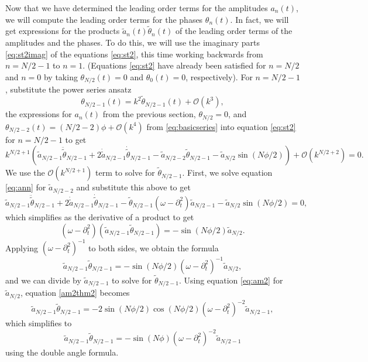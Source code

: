 \documentclass[11pt,reqno]{amsart}
\begin{document}
Now that we have determined the leading order terms for the amplitudes $a_n(t)$, we will compute the leading order terms for the phases $\theta_n(t)$. In fact, we will get expressions for the products $\tilde{a}_n(t) \tilde{\theta}_n(t)$ of the leading order terms of the amplitudes and the phases. To do this, we will use the imaginary parts \cref{eq:st2imag} of the equations \cref{eq:st2}, this time working backwards from $n = N/2-1$ to $n=1$. (Equations \cref{eq:st2} have already been satisfied for $n=N/2$ and $n=0$ by taking $\theta_{N/2}(t) = 0$ and $\theta_0(t) = 0$, respectively). For $n=N/2-1$, substitute the power series ansatz
\[
\theta_{N/2-1}(t) = k^2 \tilde{\theta}_{N/2-1}(t) + \mathcal{O}(k^{3}),
\]
the expressions for $a_n(t)$ from the previous section, $\theta_{N/2} = 0$, and
$\theta_{N/2-2}(t) = (N/2-2)\phi + \mathcal{O}(k^4)$ from \cref{eq:basicseries} into equation \cref{eq:st2} for $n=N/2-1$ to get
\[
k^{N/2+1} \left( \tilde{a}_{N/2-1} \ddot{\tilde{\theta}}_{N/2-1} + 2 \dot{\tilde{a}}_{N/2-1} \dot{\tilde{\theta}}_{N/2-1} - \tilde{a}_{N/2-2} \tilde{\theta}_{N/2-1} - \tilde{a}_{N/2} \sin(N \phi/2) \right) + \mathcal{O}(k^{N/2+2}) = 0.
\]
We use the $\mathcal{O}(k^{N/2+1})$ term to solve for $\tilde{\theta}_{N/2-1}$. First, we solve equation \cref{eq:ann} for $\tilde{a}_{N/2-2}$ and substitute this above to get
\[
\tilde{a}_{N/2-1} \ddot{\tilde{\theta}}_{N/2-1} + 2 \dot{\tilde{a}}_{N/2-1} \dot{\tilde{\theta}}_{N/2-1} - \tilde{\theta}_{N/2-1} (\omega - \partial_t^2) \tilde{a}_{N/2-1} - \tilde{a}_{N/2} \sin(N \phi/2) = 0,
\]
which simplifies as the derivative of a product to get
\[
(\omega - \partial_t^2)\left( \tilde{a}_{N/2-1} \tilde{\theta}_{N/2-1} \right) = -\sin(N \phi/2) \tilde{a}_{N/2}.
\]
Applying $(\omega - \partial_t^2)^{-1}$ to both sides, we obtain the formula
\begin{equation}\label{am2thm2}
\tilde{a}_{N/2-1} \tilde{\theta}_{N/2-1} = -\sin(N \phi/2) (\omega - \partial_t^2)^{-1} \tilde{a}_{N/2},
\end{equation}
and we can divide by $\tilde{a}_{N/2-1}$ to solve for $\tilde{\theta}_{N/2-1}$. Using equation \cref{eq:am2} for $\tilde{a}_{N/2}$, equation \cref{am2thm2} becomes
\[
\tilde{a}_{N/2-1} \tilde{\theta}_{N/2-1} = -2 \sin(N \phi/2) \cos( N\phi/2) (\omega - \partial_t^2)^{-2} \tilde{a}_{N/2-1},
\]
which simplifies to 
\begin{equation}\label{am2thm2a}
\tilde{a}_{N/2-1} \tilde{\theta}_{N/2-1} = -\sin(N \phi) (\omega - \partial_t^2)^{-2} \tilde{a}_{N/2-1}
\end{equation}
using the double angle formula.
\end{document}
